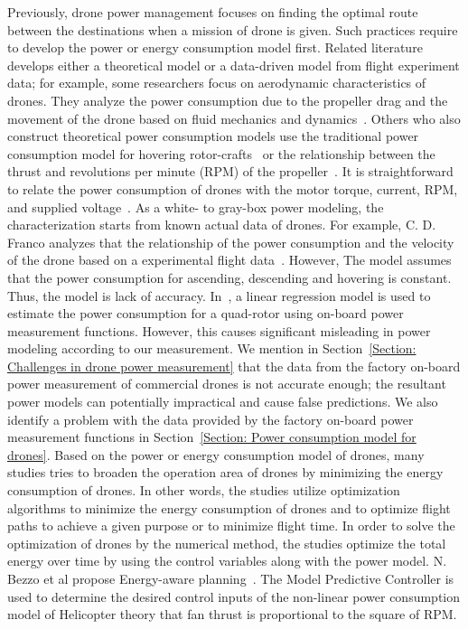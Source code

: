 \documentclass[journal]{./template/IEEEtran}
\begin{document}
Previously, drone power management focuses on finding the optimal route between the destinations when a mission of drone is given.
Such practices require to develop the power or energy consumption model first. 
Related literature develops either a theoretical model or a data-driven model from flight experiment data; for example, some researchers focus on aerodynamic characteristics of drones.
They analyze the power consumption due to the propeller drag and the movement of the drone based on fluid mechanics and dynamics~\cite{ref_3}. 
Others who also construct theoretical power consumption models use the traditional power consumption model for hovering rotor-crafts~\cite{ref_4} 
or the relationship between the thrust and revolutions per minute (RPM) of the propeller~\cite{ref_5}. 
It is straightforward to relate the power consumption of drones with the motor torque, current, RPM, and supplied voltage~\cite{ref_6,ref_7}. 
As a white- to gray-box power modeling, the characterization starts from known actual data of drones. For example, C. D. Franco analyzes that the relationship of the power consumption and the velocity of the drone based on a experimental flight data~\cite{ref_8}.  
However, The model assumes that the power consumption for ascending, descending and hovering is constant. Thus, the model is lack of accuracy.
In~\cite{ref_9}, a linear regression model is used to estimate the power consumption for a quad-rotor using on-board power measurement functions. 
However, this causes significant misleading in power modeling according to our measurement.
We mention in Section~\ref{Section: Challenges in drone power measurement} that the data from the factory on-board power measurement of commercial drones is not accurate enough; the resultant power models can potentially impractical and cause false predictions.
We also identify a problem with the data provided by the factory on-board power measurement functions in Section~\ref{Section: Power consumption model for drones}.
Based on the power or energy consumption model of drones, many studies tries to broaden the operation area of drones by minimizing the energy consumption of drones.
In other words, the studies utilize optimization algorithms to minimize the energy consumption of drones and to optimize flight paths to achieve a given purpose or to minimize flight time.
In order to solve the optimization of drones by the numerical method, the studies optimize the total energy over time by using the control variables along with the power model. 
N. Bezzo et al propose Energy-aware planning~\cite{ref_5}. The Model Predictive Controller is used to determine the desired control inputs of the non-linear power consumption model of Helicopter theory that fan thrust is proportional to the square of RPM.
\end{document}
